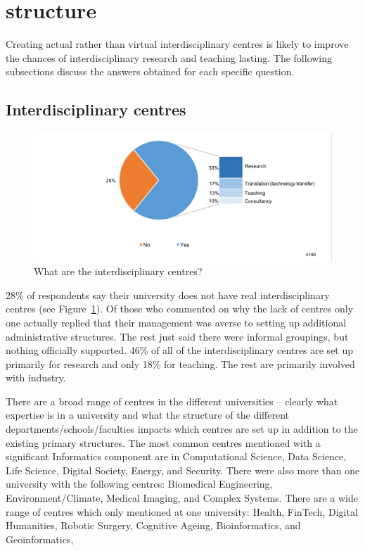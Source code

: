\section{structure}

Creating actual rather than virtual interdisciplinary centres is likely to improve the chances of interdisciplinary research and teaching lasting. The following subsections discuss the answers obtained for each specific question.


\subsection{Interdisciplinary centres}

\begin{figure}[h]
\centering
\includegraphics[width = \linewidth]{charts/5a.png}
\caption{What are the interdisciplinary centres?}
\label{sect5:centres}
\end{figure}

28\% of respondents say their university does not have real interdisciplinary centres (see Figure~\ref{sect5:centres}). Of those who commented on why the lack of centres only one actually replied that their management was averse to setting up additional administrative structures. The rest just said there were informal groupings, but nothing officially supported. 46\% of all of the interdisciplinary centres are set up primarily for research and only 18\% for teaching. The rest are primarily involved with industry.

There are a broad range of centres in the different universities -- clearly what expertise is in a university and what the structure of the different departments/schools/faculties impacts which centres are set up in addition to the existing primary structures. The most common centres mentioned with a significant Informatics component are in Computational Science, Data Science,  Life Science, Digital Society, Energy, and Security.   There were also more than one university with the following centres: Biomedical Engineering, Environment/Climate,  Medical Imaging, and  Complex Systems. There are a wide range of centres which only mentioned at one university: Health,  FinTech, Digital Humanities, Robotic Surgery, Cognitive Ageing, Bioinformatics, and Geoinformatics, 
 


